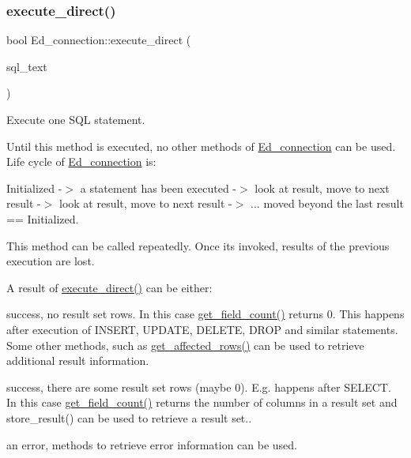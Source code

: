 \subsubsection{\texorpdfstring{execute\+\_\+direct()}{execute\_direct()}\hspace{0.1cm}{\footnotesize\ttfamily [1/2]}}
{\footnotesize\ttfamily bool Ed\+\_\+connection\+::execute\+\_\+direct (\begin{DoxyParamCaption}\item[{L\+E\+X\+\_\+\+S\+T\+R\+I\+NG}]{sql\+\_\+text }\end{DoxyParamCaption})}

Execute one S\+QL statement.

Until this method is executed, no other methods of \mbox{\hyperlink{classEd__connection}{Ed\+\_\+connection}} can be used. Life cycle of \mbox{\hyperlink{classEd__connection}{Ed\+\_\+connection}} is\+:

Initialized -\/$>$ a statement has been executed -\/$>$ look at result, move to next result -\/$>$ look at result, move to next result -\/$>$ ... moved beyond the last result == Initialized.

This method can be called repeatedly. Once it\textquotesingle{}s invoked, results of the previous execution are lost.

A result of \mbox{\hyperlink{classEd__connection_a58f9da6381da4bc1455d7f22d1620d2d}{execute\+\_\+direct()}} can be either\+:


\begin{DoxyItemize}
\item success, no result set rows. In this case \mbox{\hyperlink{classEd__connection_af704fb99d9029578af2d1acc301b8d51}{get\+\_\+field\+\_\+count()}} returns 0. This happens after execution of I\+N\+S\+E\+RT, U\+P\+D\+A\+TE, D\+E\+L\+E\+TE, D\+R\+OP and similar statements. Some other methods, such as \mbox{\hyperlink{classEd__connection_afba697853fd865d59c2bfbf851e926fe}{get\+\_\+affected\+\_\+rows()}} can be used to retrieve additional result information.
\item success, there are some result set rows (maybe 0). E.\+g. happens after S\+E\+L\+E\+CT. In this case \mbox{\hyperlink{classEd__connection_af704fb99d9029578af2d1acc301b8d51}{get\+\_\+field\+\_\+count()}} returns the number of columns in a result set and store\+\_\+result() can be used to retrieve a result set..
\item an error, methods to retrieve error information can be used.
\end{DoxyItemize}

